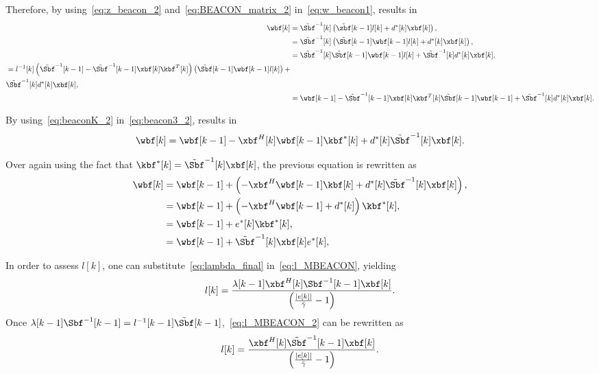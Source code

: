 Therefore, by using~\eqref{eq:z_beacon_2} and~\eqref{eq:BEACON_matrix_2} in~\eqref{eq:w_beacon1}, results in
\begin{align}
	\wbf[k] &= \tilde{\Sbf}^{-1}[k]\left(\tilde{\zbf}[k-1]l[k] + d^*[k]\xbf[k]\right), \nonumber \\
	&= \tilde{\Sbf}^{-1}[k]\left(\tilde{\Sbf}[k-1]\wbf[k-1]l[k] + d^*[k]\xbf[k]\right), \nonumber \\
	&= \tilde{\Sbf}^{-1}[k]\tilde{\Sbf}[k-1]\wbf[k-1]l[k] + \tilde{\Sbf}^{-1}[k]d^*[k]\xbf[k], \nonumber \\
	\begin{split}
		&= l^{-1}[k]\left(\tilde{\Sbf}^{-1}[k-1] - \tilde{\Sbf}^{-1}[k-1] \xbf[k] \kbf^T[k]\right) \left( \tilde{\Sbf}[k-1]\wbf[k-1]l[k]\right)+ \\
		& \tilde{\Sbf}^{-1}[k]d^*[k]\xbf[k],
	\end{split}\nonumber\\
	&= \wbf[k-1] - \tilde{\Sbf}^{-1}[k-1]\xbf[k] \kbf^T[k]\tilde{\Sbf}[k-1]\wbf[k-1] + \tilde{\Sbf}^{-1}[k]d^*[k]\xbf[k].\label{eq:beacon3_2}
\end{align}


By using~\eqref{eq:beaconK_2} in~\eqref{eq:beacon3_2}, results in
\begin{align}
	\wbf[k] = \wbf[k-1] - \xbf^H[k] \wbf[k-1]\kbf^*[k] + d^*[k]\tilde{\Sbf}^{-1}[k]\xbf[k].
\end{align}

Over again using the fact that $\kbf^*[k] = \tilde{\Sbf}^{-1}[k]\xbf[k]$, the previous equation is rewritten as
\begin{align}
	\wbf[k] &= \wbf[k-1] + \left(-\xbf^H\wbf[k-1] \kbf[k] +  d^*[k]\tilde{\Sbf}^{-1}[k]\xbf[k] \right), \nonumber \\
	&= \wbf[k-1] + \left(-\xbf^H\wbf[k-1] +  d^*[k]\right)\kbf^*[k], \nonumber \\
	&= \wbf[k-1] + e^*[k]\kbf^*[k], \nonumber\\ 
	&= \wbf[k-1] +\tilde{\Sbf}^{-1}[k]\xbf[k]e^*[k],\label{eq:beacon_final_2}
\end{align}

In order to assess $l[k]$, one can substitute~\eqref{eq:lambda_final} in~\eqref{eq:l_MBEACON}, yielding
\begin{align}\label{eq:l_MBEACON_2}
	l[k] = \frac{\lambda[k-1]\xbf^H[k]\Sbf^{-1}[k-1]\xbf[k]}{\left(\frac{\vert e[k]\vert}{\bar{\gamma}} - 1\right)}.
\end{align}
Once $\lambda[k-1]\Sbf^{-1}[k-1] = l^{-1}[k-1]\tilde{\Sbf}[k-1]$,~\eqref{eq:l_MBEACON_2} can be rewritten as
\begin{align}
	l[k] = \frac{\xbf^H[k]\tilde{\Sbf}^{-1}[k-1]\xbf[k]}{\left(\frac{\vert e[k]\vert}{\bar{\gamma}} - 1\right)}.
\end{align}




